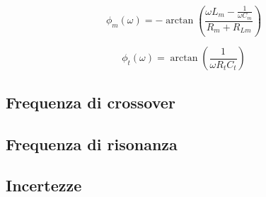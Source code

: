 \documentclass[12pt,italian]{article}
\begin{document}
\begin{equation}
  \phi_{m}(\omega) = - \arctan\left(\frac{\omega L_{m} - \frac{1}{\omega C_{m}}}{R_{m}+R_{Lm}}\right)
\end{equation}

\begin{equation}
  \phi_{t}(\omega) = \arctan\left(\frac{1}{\omega R_{t} C_{t}}\right)
\end{equation}

\subsection{Frequenza di crossover}
\label{sec:crossFreq}

\subsection{Frequenza di risonanza}
\label{sec:resFreq}

\subsection{Incertezze}
\end{document}
